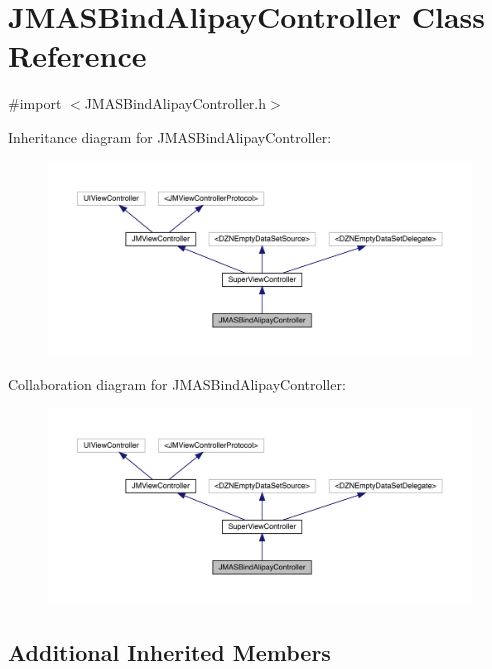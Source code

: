 \hypertarget{interface_j_m_a_s_bind_alipay_controller}{}\section{J\+M\+A\+S\+Bind\+Alipay\+Controller Class Reference}
\label{interface_j_m_a_s_bind_alipay_controller}


{\ttfamily \#import $<$J\+M\+A\+S\+Bind\+Alipay\+Controller.\+h$>$}



Inheritance diagram for J\+M\+A\+S\+Bind\+Alipay\+Controller\+:\nopagebreak
\begin{figure}[H]
\begin{center}
\leavevmode
\includegraphics[width=350pt]{interface_j_m_a_s_bind_alipay_controller__inherit__graph}
\end{center}
\end{figure}


Collaboration diagram for J\+M\+A\+S\+Bind\+Alipay\+Controller\+:\nopagebreak
\begin{figure}[H]
\begin{center}
\leavevmode
\includegraphics[width=350pt]{interface_j_m_a_s_bind_alipay_controller__coll__graph}
\end{center}
\end{figure}
\subsection*{Additional Inherited Members}



